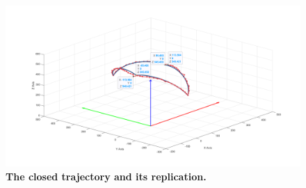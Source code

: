\begin{figure}[H] %
    \centering 
    \captionsetup{labelsep=colon}
    \includegraphics[width=1.0\textwidth]{Image/Result/circle_trajectory_replication_with_label.png} 
    \caption[The closed trajectory and its replication by IK algorithm]
    {\centering \textbf{The closed trajectory and its replication.}}
    \label{fig:clc_cross}
\end{figure}
